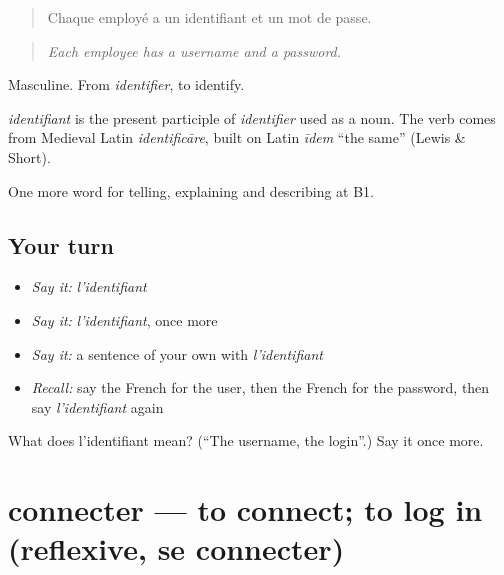 \begin{quote}
Chaque employé a un identifiant et un mot de passe.
\end{quote}

\begin{quote}
\emph{Each employee has a username and a password.}
\end{quote}

Masculine. From \emph{identifier}, to identify.

\begin{cousinweb}
\emph{identifiant} is the present participle of \emph{identifier} used as a noun. The verb comes from Medieval Latin \emph{identificāre}, built on Latin \emph{īdem} \textquotedblleft{}the same\textquotedblright{} (Lewis \& Short).
\end{cousinweb}

\begin{grammarlens}[title={What you've built}]
One more word for telling, explaining and describing at B1.
\end{grammarlens}

\subsection*{Your turn}
\begin{itemize}
\raggedright
  \item \emph{Say it:} \emph{l'identifiant}
  \item \emph{Say it:} \emph{l'identifiant}, once more
  \item \emph{Say it:} a sentence of your own with \emph{l'identifiant}
  \item \emph{Recall:} say the French for the user, then the French for the password, then say \emph{l'identifiant} again
\end{itemize}

\begin{tcolorbox}[breakable,colback=teal!4,colframe=teal!35!black,title={Before you move on}]
What does l'identifiant mean? (\textquotedblleft{}The username, the login\textquotedblright{}.) Say it once more.
\end{tcolorbox}
\section[connecter]{connecter — to connect; to log in (reflexive, se connecter)}

\label{lesson:FR-C395-connecter}



